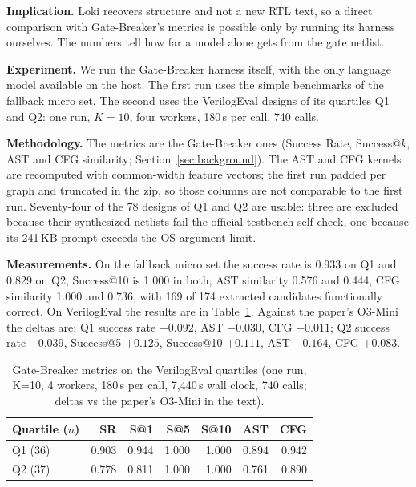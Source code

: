 \documentclass[conference]{IEEEtran}
\newcommand{\hev}[1]{\par\smallskip\noindent\textbf{#1}}
\begin{document}
\hev{Implication.} Loki recovers structure and not a new RTL text, so a direct comparison with Gate-Breaker's metrics is possible only by running its harness ourselves. The numbers tell how far a model alone gets from the gate netlist.

\hev{Experiment.} We run the Gate-Breaker harness itself, with the only language model available on the host. The first run uses the simple benchmarks of the fallback micro set. The second uses the VerilogEval designs of its quartiles Q1 and Q2: one run, $K=10$, four workers, 180\,s per call, 740 calls.

\hev{Methodology.} The metrics are the Gate-Breaker ones (Success Rate, Success@$k$, AST and CFG similarity; Section~\ref{sec:background}). The AST and CFG kernels are recomputed with common-width feature vectors; the first run padded per graph and truncated in the zip, so those columns are not comparable to the first run. Seventy-four of the 78 designs of Q1 and Q2 are usable: three are excluded because their synthesized netlists fail the official testbench self-check, one because its 241\,KB prompt exceeds the OS argument limit.

\hev{Measurements.} On the fallback micro set the success rate is 0.933 on Q1 and 0.829 on Q2, Success@10 is 1.000 in both, AST similarity 0.576 and 0.444, CFG similarity 1.000 and 0.736, with 169 of 174 extracted candidates functionally correct. On VerilogEval the results are in Table~\ref{tab:veval}. Against the paper's O3-Mini the deltas are: Q1 success rate $-0.092$, AST $-0.030$, CFG $-0.011$; Q2 success rate $-0.039$, Success@5 $+0.125$, Success@10 $+0.111$, AST $-0.164$, CFG $+0.083$.

\begin{table}[t]
\caption{Gate-Breaker metrics on the VerilogEval quartiles (one run, K=10, 4 workers, 180\,s
per call, 7,440\,s wall clock, 740 calls; deltas vs the paper's O3-Mini in the text).}
\label{tab:veval}
\centering
\footnotesize
\begin{tabular}{@{}lrrrrrr@{}}
\toprule
Quartile ($n$) & SR & S@1 & S@5 & S@10 & AST & CFG \\
\midrule
Q1 (36) & 0.903 & 0.944 & 1.000 & 1.000 & 0.894 & 0.942 \\
Q2 (37) & 0.778 & 0.811 & 1.000 & 1.000 & 0.761 & 0.890 \\
\bottomrule
\end{tabular}
\end{table}
\end{document}
